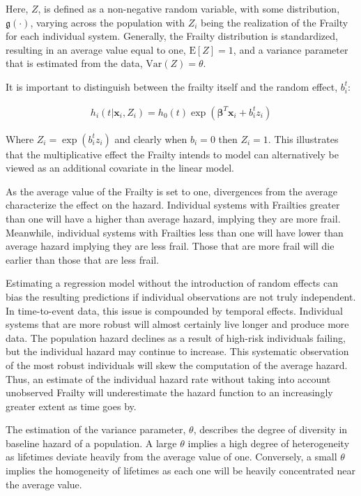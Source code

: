 Here, $Z$, is defined as a non-negative random variable, with some distribution, $\mathfrak{g}(\cdot)$, varying across the population\cite{Wienke2010} with $Z_i$ being the realization of the Frailty for each individual system. Generally, the Frailty distribution is standardized, resulting in an average value equal to one, $\mathrm{E}[Z] = 1$, and a variance parameter that is estimated from the data, $\text{Var}(Z) = \theta$.

It is important to distinguish between the frailty itself and the random effect, $b_i^t$:  

\begin{align*}
h_i(t|\textbf{x}_i, Z_{i}) = h_0(t) \exp(\boldsymbol\beta^T \textbf{x}_i + b_i^t z_i)
\end{align*}

Where $Z_{i} = \exp(b_i^t z_{i})$ and clearly when $b_i = 0$ then $Z_i = 1$. This illustrates that the multiplicative effect the Frailty intends to model can alternatively be viewed as an additional covariate in the linear model. 


As the average value of the Frailty is set to one, divergences from the average characterize the effect on the hazard. Individual systems with Frailties greater than one will have a higher than average hazard, implying they are more frail. Meanwhile, individual systems with Frailties less than one will have lower than average hazard implying they are less frail. Those that are more frail will die earlier than those that are less frail.

Estimating a regression model without the introduction of random effects can bias the resulting predictions if individual observations are not truly independent. In time-to-event data, this issue is compounded by temporal effects. Individual systems that are more robust will almost certainly live longer and produce more data. The population hazard declines as a result of high-risk individuals failing, but the individual hazard may continue to increase. This systematic observation of the most robust individuals will skew the computation of the average hazard. Thus, an estimate of the individual hazard rate without taking into account unobserved Frailty will underestimate the hazard function to an increasingly greater extent as time goes by\cite{Aalen2008}.

The estimation of the variance parameter, $\theta$, describes the degree of diversity in baseline hazard of a population. A large $\theta$ implies a high degree of heterogeneity as lifetimes deviate heavily from the average value of one. Conversely, a small $\theta$ implies the homogeneity of lifetimes as each one will be heavily concentrated near the average value.


